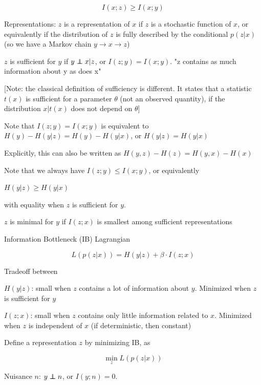 \documentclass[english]{article}
\begin{document}
$$I(x;z) \ge I(x;y)$$

\eenum 


\item 
 Representations: $z$ is a representation of $x$ if $z$ is a stochastic function of $x$, or equivalently if the distribution of $z$ is fully described by the conditional $p(z|x)$ (so we have a Markov chain $y\to x\to z$)


\benum 
\item 
$z$ is sufficient for $y$ if $y\indep x|z$, or $I(z;y) = I(x;y)$. "z contains as much information about y as does x" 


 [Note: the classical definition of sufficiency is different. It states that a statistic $t(x)$ is sufficient for a parameter $\theta$ (not an observed quantity), if the distribution $x|t(x)$ does not depend on $\theta$]



Note that $I(z;y) = I(x;y)$ is equivalent to $H(y)-H(y|z)=H(y)-H(y|x)$, or $H(y|z)=H(y|x)$

Explicitly, this can also be written as  $H(y,z)-H(z)=H(y,x)-H(x)$

Note that we always have $I(z;y) \le I(x;y)$, or equivalently 

$H(y|z)\ge H(y|x)$

with equality when $z$ is sufficient for $y$.

\item $z$ is minimal for $y$ if $I(z;x)$ is smallest among sufficient representations
\eenum 

\item Information Bottleneck (IB) Lagrangian

$$L(p(z|x)) = H(y|z) +\beta \cdot I(z;x)$$

Tradeoff between

\benum 
\item $H(y|z)$: small when $z$  contains a lot of information about $y$. Minimized when $z$ is sufficient for $y$


\item $I(z;x)$: small when $z$ contains only little information related to $x$. Minimized when $z$ is independent of $x$ (if deterministic, then constant)

\eenum 

Define a representation $z$ by minimizing IB, as 

$$\min_z L(p(z|x))$$

\item Nuisance $n$: $y\indep n$, or $I(y;n)=0$.
\end{document}
